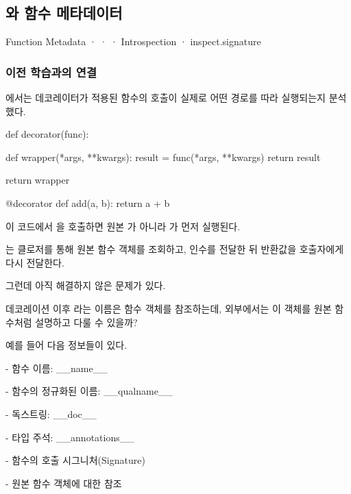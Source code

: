 

\subsection{와 함수 메타데이터}

Function Metadata ·  ·  · Introspection · inspect.signature

\subsubsection{이전 학습과의 연결}

에서는 데코레이터가 적용된 함수의 호출이 실제로 어떤 경로를 따라 실행되는지 분석했다.

\begin{dhkcode}
def decorator(func):

    def wrapper(*args, **kwargs):
        result = func(*args, **kwargs)
        return result

    return wrapper


@decorator
def add(a, b):
    return a + b
\end{dhkcode}

이 코드에서 을 호출하면 원본 가 아니라 가 먼저 실행된다.

는 클로저를 통해 원본 함수 객체를 조회하고, 인수를 전달한 뒤 반환값을 호출자에게 다시 전달한다.

그런데 아직 해결하지 않은 문제가 있다.

데코레이션 이후 라는 이름은  함수 객체를 참조하는데, 외부에서는 이 객체를 원본  함수처럼 설명하고 다룰 수 있을까?

예를 들어 다음 정보들이 있다.

\begin{dhksmry}
    - 함수 이름: __name__

    - 함수의 정규화된 이름: __qualname__

    - 독스트링: __doc__

    - 타입 주석: __annotations__

    - 함수의 호출 시그니처(Signature)

    - 원본 함수 객체에 대한 참조
\end{dhksmry}

